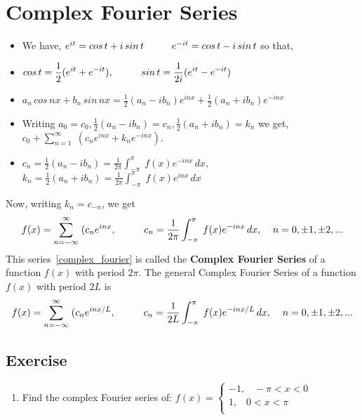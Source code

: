 \documentclass[aima331_lecturenotes_ku.tex]{subfiles}
\begin{document}
\section{Complex Fourier Series}
\begin{itemize}
\item We have, $e^{it}=cos\,t + i\, sin\, t \hspace{10mm} e^{-it}=cos\,t - i\, sin\, t$ so that,
  \vspace{4mm}
\item $\displaystyle cos\, t = \frac{1}{2}(e^{it} + e^{-it}), \hspace{10mm} sin\,t = \frac{1}{2i}(e^{it} - e^{-it})$
\vspace{4mm}
\item $\displaystyle a_n\, cos\,nx + b_n \, sin\,nx = \frac{1}{2}(a_n - ib_n)e^{inx} + \frac{1}{2}(a_n + ib_n)e^{-inx}$
\vspace{4mm}
\item Writing $a_0 = c_0, \frac{1}{2}(a_n - ib_n) = c_n,  \frac{1}{2}(a_n + ib_n) = k_n$ we get, $\displaystyle c_0 + \sum_{n=1}^{\infty}\; (c_ne^{inx} + k_ne^{-inx})$.
\vspace{4mm}
\item $\displaystyle c_n = \frac{1}{2}(a_n - ib_n) = \frac{1}{2\pi} \int_{-\pi}^{\pi} \; f(x)e^{-inx} \, dx$, \hspace{5mm} $\displaystyle k_n = \frac{1}{2}(a_n + ib_n) = \frac{1}{2\pi} \int_{-\pi}^{\pi} \; f(x)e^{inx} \, dx$
\end{itemize}
Now, writing $k_n = c_{-n}$, we get
\begin{equation}
  \label{complex_fourier}
  f(x) = \sum_{n= -\infty}^{\infty}\; (c_ne^{inx}, \hspace{10mm}  c_n = \frac{1}{2\pi} \int_{-\pi}^{\pi} \; f(x)e^{-inx} \, dx, \;\;\;\; n = 0, \pm 1, \pm 2, ...
\end{equation}
This series~\ref{complex_fourier} is called the
\textbf{Complex Fourier Series} of a function $f(x)$ with period $2\pi$. The general Complex Fourier Series of a function $f(x)$ with period $2L$ is
\begin{equation}
  \label{complex_fourier_general}
  f(x) = \sum_{n= -\infty}^{\infty}\; (c_ne^{inx/L}, \hspace{10mm}  c_n = \frac{1}{2L} \int_{-\pi}^{\pi} \; f(x)e^{-inx/L} \, dx, \;\;\;\; n = 0, \pm 1, \pm 2, ...
\end{equation}
\subsection{Exercise}
\begin{enumerate}
\item Find the complex Fourier series of: $f(x) =
  \begin{cases}
    -1, \;\;\; -\pi < x < 0 \\
    1, \;\;\; 0 < x < \pi \\
  \end{cases}
 $
\end{enumerate}
\end{document}
